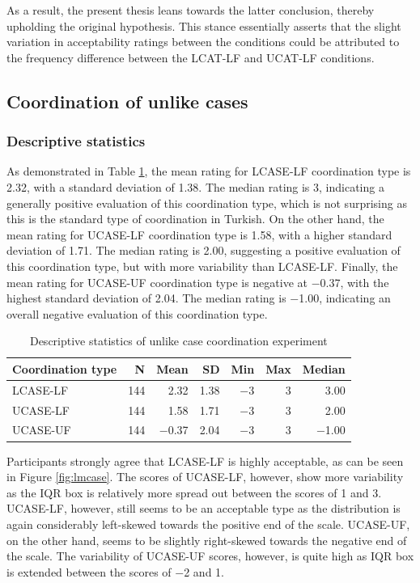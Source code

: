 As a result, the present thesis leans towards the latter conclusion, thereby upholding the original hypothesis. This stance essentially asserts that the slight variation in acceptability ratings between the conditions could be attributed to the frequency difference between the LCAT-LF and UCAT-LF conditions.

\subsection{Coordination of unlike cases}
\subsubsection{Descriptive statistics}

As demonstrated in Table \ref{tab:unlikecase_descriptive}, the mean rating for LCASE-LF coordination type is 2.32, with a standard deviation of 1.38. The median rating is 3, indicating a generally positive evaluation of this coordination type, which is not surprising as this is the standard type of coordination in Turkish. On the other hand, the mean rating for UCASE-LF coordination type is 1.58, with a higher standard deviation of 1.71. The median rating is 2.00, suggesting a positive evaluation of this coordination type, but with more variability than LCASE-LF. Finally, the mean rating for UCASE-UF coordination type is negative at $-$0.37, with the highest standard deviation of 2.04. The median rating is $-$1.00, indicating an overall negative evaluation of this coordination type. 

\begin{table}[ht]
	\centering
	\begin{tabular}{lrrrrrr}
		\textbf{Coordination type} & \textbf{N} & \textbf{Mean} & \textbf{SD} & \textbf{Min} & \textbf{Max} & \textbf{Median}  \\ 
		\hline \hline
		LCASE-LF & 144 &2.32 & 1.38 &  $-$3 &   3 & 3.00  \\ 
		UCASE-LF & 144 &1.58 & 1.71 &  $-$3 &   3 & 2.00  \\ 
		UCASE-UF & 144 &$-$0.37 & 2.04 &  $-$3 &   3 & $-$1.00  \\ 
		\hline \hline
	\end{tabular}
	\caption{Descriptive statistics of unlike case coordination experiment}
	\label{tab:unlikecase_descriptive} 
\end{table}

Participants strongly agree that LCASE-LF is highly acceptable, as can be seen in Figure \ref{fig:lmcase}. The scores of UCASE-LF, however, show more variability as the IQR box is relatively more spread out between the scores of 1 and 3. UCASE-LF, however, still seems to be an acceptable type as the distribution is again considerably left-skewed towards the positive end of the scale. UCASE-UF, on the other hand, seems to be slightly right-skewed towards the negative end of the scale. The variability of UCASE-UF scores, however, is quite high as IQR box is extended between the scores of $-$2 and 1.


